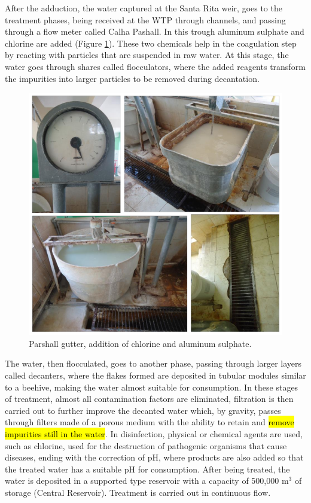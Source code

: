 \documentclass{singlecol}
\theoremstyle{TH}{
\newtheorem{lemma}{Lemma}
\newtheorem{theorem}[lemma]{Theorem}
\newtheorem{corrolary}[lemma]{Corrolary}
\newtheorem{conjecture}[lemma]{Conjecture}
\newtheorem{proposition}[lemma]{Proposition}
\newtheorem{claim}[lemma]{Claim}
\newtheorem{stheorem}[lemma]{Wrong Theorem}
\newtheorem{algorithm}{Algorithm}
}
\theoremstyle{THrm}{
\newtheorem{definition}{Definition}[section]
\newtheorem{question}{Question}[section]
\newtheorem{remark}{Remark}
\newtheorem{scheme}{Scheme}
}
\theoremstyle{THhit}{
\newtheorem{case}{Case}[section]
}
\begin{document}
After the adduction, the water captured at the Santa Rita weir, goes to the treatment phases, being received at the WTP through channels, and passing through a flow meter called Calha Pashall. In this trough aluminum sulphate and chlorine are added (Figure \ref{fig:WTPParshall}). These two chemicals help in the coagulation step by reacting with particles that are suspended in raw water. At this stage, the water goes through shares called flocculators, where the added reagents transform the impurities into larger particles to be removed during decantation. 

\begin{figure}[h]
\caption{Parshall gutter, addition of chlorine and aluminum sulphate.}
\label{fig:WTPParshall}
\centering
\includegraphics[width=\textwidth]{figures/calhaPashall.png}
\end{figure}

The water, then flocculated, goes to another phase, passing through larger layers called decanters, where the flakes formed are deposited in tubular modules similar to a beehive, making the water almost suitable for consumption. In these stages of treatment, almost all contamination factors are eliminated, filtration is then carried out to further improve the decanted water which, by gravity, passes through filters made of a porous medium with the ability to retain and \hl{remove impurities still in the water}. In disinfection, physical or chemical agents are used, such as chlorine, used for the destruction of pathogenic organisms that cause diseases, ending with the correction of pH, where products are also added so that the treated water has a suitable pH for consumption. After being treated, the water is deposited in a supported type reservoir with a capacity of 500,000 m$^3$ of storage (Central Reservoir). Treatment is carried out in continuous flow. 
\end{document}
